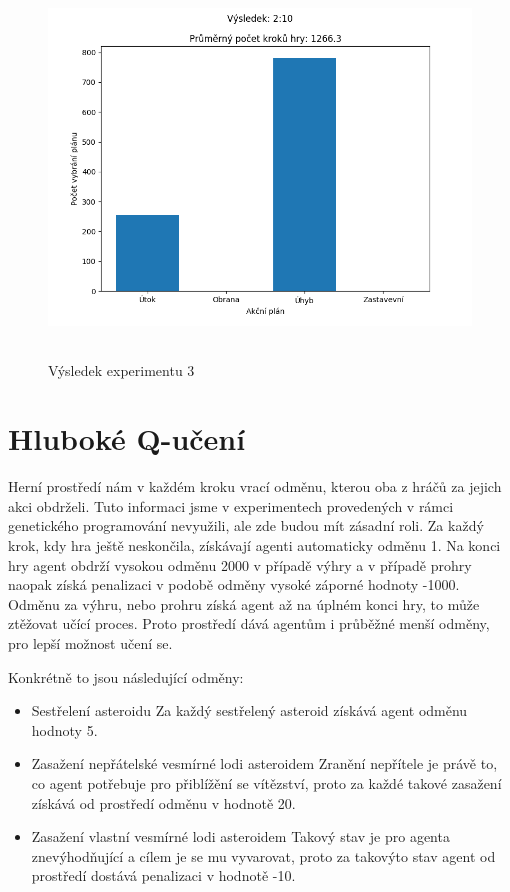 \begin{figure}[p]\centering
\includegraphics[width=125mm, height=100mm]{./Obrazky/Experiment03Results.png}
\caption{Výsledek experimentu 3}
\label{Výsledek experimentu 03}
\end{figure}





\section{Hluboké Q-učení}
Herní prostředí nám v každém kroku vrací odměnu, kterou oba z hráčů za jejich akci obdrželi. Tuto informaci jsme v experimentech provedených v rámci genetického programování nevyužili, ale zde budou mít zásadní roli.
Za každý krok, kdy hra ještě neskončila, získávají agenti automaticky odměnu 1. Na konci hry agent obdrží vysokou odměnu 2000 v případě výhry a v případě prohry naopak získá penalizaci v podobě odměny vysoké záporné hodnoty -1000.
Odměnu za výhru, nebo prohru získá agent až na úplném konci hry, to může ztěžovat učící proces. Proto prostředí dává agentům i průběžné menší odměny, pro lepší možnost učení se.

Konkrétně to jsou následující odměny:
\begin{itemize}
    \item Sestřelení asteroidu
        \newline
        Za každý sestřelený asteroid získává agent odměnu hodnoty 5.
    \item Zasažení nepřátelské vesmírné lodi asteroidem 
        \newline
        Zranění nepřítele je právě to, co agent potřebuje pro přiblížění se vítězství, proto za každé takové zasažení získává od prostředí odměnu v hodnotě 20.
    \item Zasažení vlastní vesmírné lodi asteroidem
        \newline
        Takový stav je pro agenta znevýhodňující a cílem je se mu vyvarovat, proto za takovýto stav agent od prostředí dostává penalizaci v hodnotě -10.
\end{itemize}


